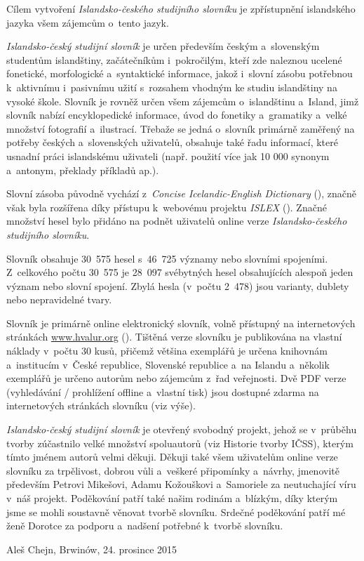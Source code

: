 Cílem vytvoření\textit{ Islandsko-českého studijního slovníku} je zpřístupnění islandského jazyka všem zájemcům o~tento jazyk. 

\textit{Islandsko-český studijní slovník} je určen především českým a~slovenským studentům islandštiny, začátečníkům i~pokročilým, kteří zde naleznou ucelené fonetické, morfologické a~syntaktické informace, jakož
i~slovní zásobu potřebnou k~aktivnímu i~pasivnímu užití s~rozsahem vhodným ke studiu islandštiny na vysoké škole.
Slovník je rovněž určen všem zájemcům o~islandštinu a~Island, jimž slovník nabízí encyklopedické informace, úvod do fonetiky a~gramatiky a~velké množství fotografií a~ilustrací. 
Třebaže se jedná o~slovník primárně zaměřený na potřeby českých a~slovenských uživatelů, obsahuje také řadu informací, které usnadní práci islandskému uživateli (např. použití více jak 10 000 synonym a~antonym, překlady příkladů ap.).

Slovní zásoba původně vychází z~\textit{Concise Icelandic-English Dictionary} (\cite {ic_en}), značně však byla rozšířena díky přístupu k~webovému projektu \textit{ISLEX} (\cite {int1}). Značné množství hesel bylo
přidáno na podnět uživatelů online verze \textit{Islandsko-českého studijního slovníku}.

Slovník obsahuje 30~575 hesel s~46~725 významy nebo slovními spojeními. Z~celkového počtu 30~575 je 28~097 svébytných hesel obsahujících alespoň jeden význam nebo slovní spojení. 
Zbylá hesla (v~počtu 2~478) jsou varianty, dublety nebo nepravidelné tvary.

Slovník je primárně online elektronický slovník, volně přístupný na internetových stránkách \url{www.hvalur.org}  (\cite {int14}). 
Tištěná verze slovníku je publikována na vlastní náklady v~počtu 30 kusů, přičemž většina exemplářů je určena knihovnám a~institucím v~České republice, Slovenské republice a~na Islandu
a~několik exemplářů je určeno autorům nebo zájemcům z~řad veřejnosti. Dvě PDF verze (vyhledávání / prohlížení offline a~vlastní tisk) jsou dostupné zdarma na internetových stránkách slovníku (viz výše).

\textit{Islandsko-český studijní slovník} je otevřený svobodný projekt, jehož se v~průběhu tvorby zúčastnilo velké množství spoluautorů (viz Historie tvorby IČSS), kterým tímto jménem autorů velmi děkuji.
Děkuji také všem uživatelům online verze slovníku za trpělivost, dobrou vůli a~veškeré připomínky a~návrhy, jmenovitě především Petrovi Mikešovi, Adamu Kožouškovi a~Samoriele za neutuchající víru v~náš projekt.
Poděkování patří také našim rodinám a~blízkým, díky kterým jsme se mohli soustavně věnovat tvorbě slovníku.
Srdečné poděkování patří mé ženě Dorotce za podporu a~nadšení potřebné k~tvorbě slovníku.

\blspace[5]

{\centering Aleš Chejn, Brwinów, 24. prosince 2015\par}

